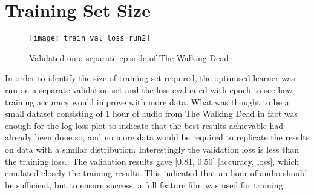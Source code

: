 \section{Training Set Size}
\begin{wrapfigure}{l}{0.3\textwidth} 
	\texttt{[image: train\_val\_loss\_run2]}
	\caption{Validated on a separate episode of The Walking Dead}
	\label{val_loss}
\end{wrapfigure}
In order to identify the size of training set required, the optimised learner was run on a separate validation set and the loss evaluated with epoch to see how training accuracy would improve with more data. What was thought to be a small dataset consisting of 1 hour of audio from The Walking Dead in fact was enough for the log-loss plot to indicate that the best results achievable had already been done so, and no more data would be required to replicate the results on data with a similar distribution.
Interestingly the validation loss is less than the training loss..
The validation results gave [0.81, 0.50] [accuracy, loss], which emulated closely the training results. This indicated that an hour of audio should be sufficient, but to ensure success, a full feature film was used for training.

